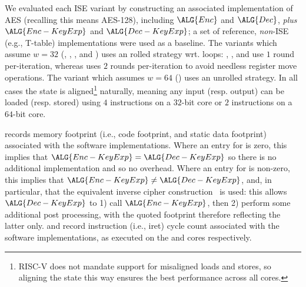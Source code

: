 
We evaluated each ISE variant by constructing an associated implementation
of AES (recalling this means AES-128), including
$\ALG{Enc}$
and
$\ALG{Dec}$,
{\em plus}
$\ALG{Enc-KeyExp}$
and
$\ALG{Dec-KeyExp}$;
a set of reference, {\em non}-ISE 
(e.g., T-table) 
implementations were used as a baseline.
The variants which assume  $w = 32$
(, ,     , and )
uses an   rolled strategy wrt. loops:
 , ,              and 
use  $1$ round  per-iteration,
whereas
uses $2$ rounds per-iteration
to avoid needless register move operations.
The variant  which assumes $w = 64$
()
uses an unrolled strategy.
In all cases the state is aligned\footnote{%
RISC-V does not mandate support for misaligned loads and stores, so
aligning the state this way ensures the best performance across all
cores.
} naturally, meaning any input (resp. output) can be loaded (resp. stored) 
using 
$4$  instructions on a $32$-bit core
or
$2$  instructions on a $64$-bit core.

records
memory footprint (i.e., code footprint, and static data footprint)
associated with the software implementations.
Where an entry for
is     zero, this implies that
$\ALG{Enc-KeyExp} =    \ALG{Dec-KeyExp}$
so there is no additional implementation and so no overhead.
Where an entry for
is non-zero, this implies that
$\ALG{Enc-KeyExp} \neq \ALG{Dec-KeyExp}$,
and, in particular, that the equivalent inverse cipher construction~\cite[Section 5.3.5]{FIPS:197}
is used: this allows $\ALG{Dec-KeyExp}$ to
1) call $\ALG{Enc-KeyExp}$,
   then
2) perform some additional post processing,
with the quoted footprint therefore reflecting the latter only.  
and
record
instruction (i.e., iret) cycle count
associated with the software implementations,
as executed on the  and  cores respectively.

